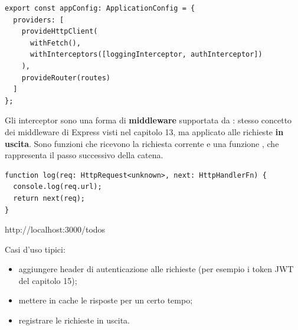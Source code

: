 \begin{affianco}[0.52][c]
\codicepiccolo
\begin{lstlisting}[style=ts, name=app.config.ts]
export const appConfig: ApplicationConfig = {
  providers: [
    provideHttpClient(
      withFetch(),
      withInterceptors([loggingInterceptor, authInterceptor])
    ),
    provideRouter(routes)
  ]
};
\end{lstlisting}
\risultato
\begin{immagine}
\end{immagine}
\end{affianco}

Gli interceptor sono una forma di \textbf{middleware} supportata da
: stesso concetto dei middleware di Express visti nel capitolo
13, ma applicato alle richieste \textbf{in uscita}. Sono funzioni che ricevono
la richiesta corrente e una funzione , che rappresenta il passo
successivo della catena.

\begin{affianco}[0.62][c]
\codicepiccolo
\begin{lstlisting}[style=ts, name=interceptors.ts]
function log(req: HttpRequest<unknown>, next: HttpHandlerFn) {
  console.log(req.url);
  return next(req);
}
\end{lstlisting}
\risultato
\begin{console}
http://localhost:3000/todos
\end{console}
\end{affianco}

Casi d'uso tipici:

\begin{itemize}
  \item aggiungere header di autenticazione alle richieste (per esempio i token
        JWT del capitolo 15);
  \item mettere in cache le risposte per un certo tempo;
  \item registrare le richieste in uscita.
\end{itemize}

